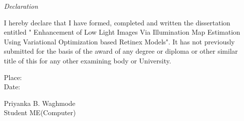 \newpage
\thispagestyle{empty}

\begin{center}
\emph{\LARGE Declaration}\\[2.5cm]
\end{center}

\normalsize I hereby declare that I have formed, completed and written the dissertation entitled " Enhancement of Low Light Images Via Illumination Map Estimation Using Variational Optimization based Retinex Models". It has not previously submitted for the basis of the award of any degree or diploma or other similar title of this for any other examining body or University.
\begin{flushleft}
Place:\\
Date:
\end{flushleft}




\begin{flushright}
Priyanka B. Waghmode\\
Student ME(Computer)\\[1.5cm]
\end{flushright}

